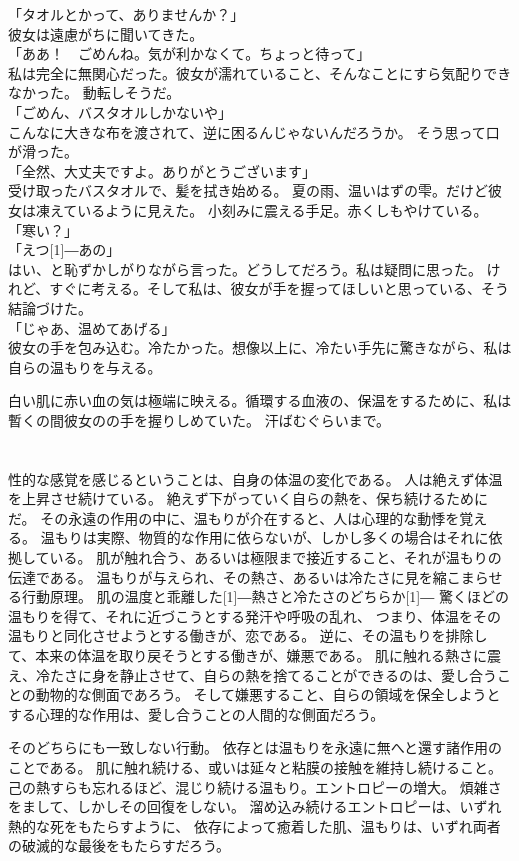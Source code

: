 \documentclass[../IHMain]{subfiles}
\begin{document}
「タオルとかって、ありませんか？」\\
彼女は遠慮がちに聞いてきた。\\
「ああ！　ごめんね。気が利かなくて。ちょっと待って」\\
私は完全に無関心だった。彼女が濡れていること、そんなことにすら気配りできなかった。
動転しそうだ。\\
「ごめん、バスタオルしかないや」\\
こんなに大きな布を渡されて、逆に困るんじゃないんだろうか。
そう思って口が滑った。\\
「全然、大丈夫ですよ。ありがとうございます」\\
受け取ったバスタオルで、髪を拭き始める。
夏の雨、温いはずの雫。だけど彼女は凍えているように見えた。
小刻みに震える手足。赤くしもやけている。\\
「寒い？」\\
「えつ\scalebox{3}[1]{―}あの」\\
はい、と恥ずかしがりながら言った。どうしてだろう。私は疑問に思った。
けれど、すぐに考える。そして私は、彼女が手を握ってほしいと思っている、そう結論づけた。\\
「じゃあ、温めてあげる」\\
彼女の手を包み込む。冷たかった。想像以上に、冷たい手先に驚きながら、私は自らの温もりを与える。

白い肌に赤い血の気は極端に映える。循環する血液の、保温をするために、私は暫くの間彼女のの手を握りしめていた。
汗ばむぐらいまで。

\section{}
性的な感覚を感じるということは、自身の体温の変化である。
人は絶えず体温を上昇させ続けている。
絶えず下がっていく自らの熱を、保ち続けるためにだ。
その永遠の作用の中に、温もりが介在すると、人は心理的な動悸を覚える。
温もりは実際、物質的な作用に依らないが、しかし多くの場合はそれに依拠している。
肌が触れ合う、あるいは極限まで接近すること、それが温もりの伝達である。
温もりが与えられ、その熱さ、あるいは冷たさに見を縮こまらせる行動原理。
肌の温度と乖離した\scalebox{3}[1]{―}熱さと冷たさのどちらか\scalebox{3}[1]{―}
驚くほどの温もりを得て、それに近づこうとする発汗や呼吸の乱れ、
つまり、体温をその温もりと同化させようとする働きが、恋である。
逆に、その温もりを排除して、本来の体温を取り戻そうとする働きが、嫌悪である。
肌に触れる熱さに震え、冷たさに身を静止させて、自らの熱を捨てることができるのは、愛し合うことの動物的な側面であろう。
そして嫌悪すること、自らの領域を保全しようとする心理的な作用は、愛し合うことの人間的な側面だろう。

そのどちらにも一致しない行動。
依存とは温もりを永遠に無へと還す諸作用のことである。
肌に触れ続ける、或いは延々と粘膜の接触を維持し続けること。
己の熱すらも忘れるほど、混じり続ける温もり。エントロピーの増大。
煩雑さをまして、しかしその回復をしない。
溜め込み続けるエントロピーは、いずれ熱的な死をもたらすように、
依存によって癒着した肌、温もりは、いずれ両者の破滅的な最後をもたらすだろう。
\end{document}
